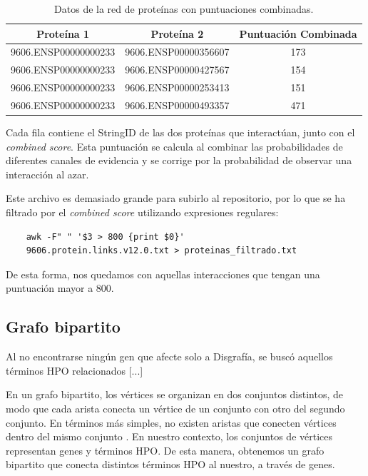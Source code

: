 
\begin{table}[h]
	\centering
	\caption{Datos de la red de proteínas con puntuaciones combinadas.}
	\label{tabla:redProteinas} 
	\begin{tabular}{|c|c|c|}
		\hline
		\textbf{Proteína 1} & \textbf{Proteína 2} & \textbf{Puntuación Combinada} \\
		\hline
		9606.ENSP00000000233 & 9606.ENSP00000356607 & 173 \\
		9606.ENSP00000000233 & 9606.ENSP00000427567 & 154 \\
		9606.ENSP00000000233 & 9606.ENSP00000253413 & 151 \\
		9606.ENSP00000000233 & 9606.ENSP00000493357 & 471 \\
		\hline
	\end{tabular}
\end{table}

Cada fila contiene el StringID de las dos proteínas que interactúan, junto con el \textit{combined score}. Esta puntuación se calcula al combinar las probabilidades de diferentes canales de evidencia y se corrige por la probabilidad de observar una interacción al azar.

Este archivo es demasiado grande para subirlo al repositorio, por lo que se ha filtrado por el \textit{combined score} utilizando expresiones regulares:

\begin{verbatim}
	awk -F" " '$3 > 800 {print $0}'
	9606.protein.links.v12.0.txt > proteinas_filtrado.txt
\end{verbatim}

De esta forma, nos quedamos con aquellas interacciones que tengan una puntuación mayor a 800.

\subsection{Grafo bipartito}

Al no encontrarse ningún gen que afecte solo a Disgrafía, se buscó aquellos términos HPO relacionados [...]

En un grafo bipartito, los vértices se organizan en dos conjuntos distintos, de modo que cada arista conecta un vértice de un conjunto con otro del segundo conjunto. En términos más simples, no existen aristas que conecten vértices dentro del mismo conjunto \cite{BiRank2017}. En nuestro contexto, los conjuntos de vértices representan genes y términos HPO. De esta manera, obtenemos un grafo bipartito que conecta distintos términos HPO al nuestro, a través de genes. 

